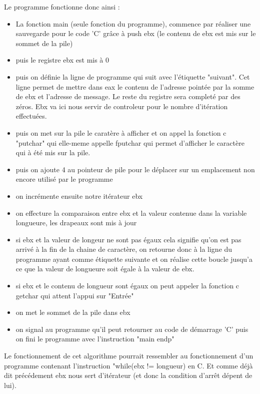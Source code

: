 \documentclass[11pt]{report}
\begin{document}
Le programme fonctionne donc ainsi :
\begin{itemize}
\item La fonction main (seule fonction du programme), commence par réaliser une sauvegarde pour le code 'C' grâce à push ebx (le contenu de ebx est mis sur le sommet de la pile)

\item puis le registre ebx est mis à 0
\item puis on définie la ligne de programme qui suit avec l'étiquette "suivant". Cet ligne permet de mettre dans eax le contenu de l'adresse pointée par la somme de ebx et l'adresse de message. Le reste du registre sera completé par des zéros. Ebx va ici nous servir de controleur pour le nombre d'itération effectuées.
\item puis on met sur la pile le caratère à afficher et on appel la fonction c "putchar" qui elle-meme appelle fputchar qui permet d'afficher le caractère qui à été mis sur la pile.
\item puis on ajoute 4 au pointeur de pile pour le déplacer sur un emplacement non encore utilisé par le programme
\item on incrémente ensuite notre itérateur ebx
\item on effecture la comparaison entre ebx et la valeur contenue dans la variable longueure, les drapeaux sont mis à jour
\item si ebx et la valeur de longeur ne sont pas égaux cela signifie qu'on est pas arrivé à la fin de la chaine de caractère, on retourne donc à la ligne du programme ayant comme étiquette suivante et on réalise cette boucle jusqu'a ce que la valeur de longueure soit égale à la valeur de ebx.
\item si ebx et le contenu de longueur sont égaux on peut appeler la fonction c getchar qui attent l'appui sur "Entrée"
\item on met le sommet de la pile dans ebx
\item on signal au programme qu'il peut retourner au code de démarrage 'C' puis on fini le programme avec l'instruction "main endp"

\end{itemize}

Le fonctionnement de cet algorithme pourrait ressembler au fonctionnement d'un programme contenant l'instruction "while(ebx != longueur) en C. Et comme déjà dit précédement ebx nous sert d'itérateur (et donc la condition d'arrêt dépent de lui).
\end{document}
